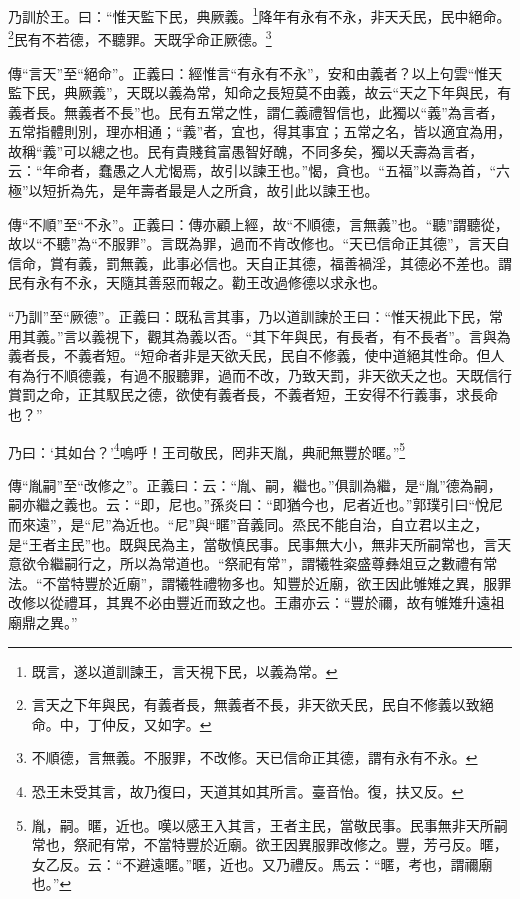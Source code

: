 乃訓於王。曰：“惟天監下民，典厥義。\footnote{既言，遂以道訓諫王，言天視下民，以義為常。}降年有永有不永，非天夭民，民中絕命。\footnote{言天之下年與民，有義者長，無義者不長，非天欲夭民，民自不修義以致絕命。中，丁仲反，又如字。}民有不若德，不聽罪。天既孚命正厥德。\footnote{不順德，言無義。不服罪，不改修。天已信命正其德，謂有永有不永。}


{\noindent\zhuan{}\fzbyks 傳“言天”至“絕命”。正義曰：經惟言“有永有不永”，安和由義者？以上句雲“惟天監下民，典厥義”，天既以義為常，知命之長短莫不由義，故云“天之下年與民，有義者長。無義者不長”也。民有五常之性，謂仁義禮智信也，此獨以“義”為言者，五常指體則別，理亦相通；“義”者，宜也，得其事宜；五常之名，皆以適宜為用，故稱“義”可以總之也。民有貴賤貧富愚智好醜，不同多矣，獨以夭壽為言者，云：“年命者，蠢愚之人尤愒焉，故引以諫王也。”愒，貪也。“五福”以壽為首，“六極”以短折為先，是年壽者最是人之所貪，故引此以諫王也。 \par}

{\noindent\zhuan{}\fzbyks 傳“不順”至“不永”。正義曰：傳亦顧上經，故“不順德，言無義”也。“聽”謂聽從，故以“不聽”為“不服罪”。言既為罪，過而不肯改修也。“天已信命正其德”，言天自信命，賞有義，罰無義，此事必信也。天自正其德，福善禍淫，其德必不差也。謂民有永有不永，天隨其善惡而報之。勸王改過修德以求永也。 \par}

{\noindent\shu{}\fzkt “乃訓”至“厥德”。正義曰：既私言其事，乃以道訓諫於王曰：“惟天視此下民，常用其義。”言以義視下，觀其為義以否。“其下年與民，有長者，有不長者”。言與為義者長，不義者短。“短命者非是天欲夭民，民自不修義，使中道絕其性命。但人有為行不順德義，有過不服聽罪，過而不改，乃致天罰，非天欲夭之也。天既信行賞罰之命，正其馭民之德，欲使有義者長，不義者短，王安得不行義事，求長命也？” \par}

乃曰：‘其如台？’\footnote{恐王未受其言，故乃復曰，天道其如其所言。臺音怡。復，扶又反。}嗚呼！王司敬民，罔非天胤，典祀無豐於暱。”\footnote{胤，嗣。暱，近也。嘆以感王入其言，王者主民，當敬民事。民事無非天所嗣常也，祭祀有常，不當特豐於近廟。欲王因異服罪改修之。豐，芳弓反。暱，女乙反。云：“不避遠暱。”暱，近也。又乃禮反。馬云：“暱，考也，謂禰廟也。”}


{\noindent\zhuan{}\fzbyks 傳“胤嗣”至“改修之”。正義曰：云：“胤、嗣，繼也。”俱訓為繼，是“胤”德為嗣，嗣亦繼之義也。云：“即，尼也。”孫炎曰：“即猶今也，尼者近也。”郭璞引曰“悅尼而來遠”，是“尼”為近也。“尼”與“暱”音義同。烝民不能自治，自立君以主之，是“王者主民”也。既與民為主，當敬慎民事。民事無大小，無非天所嗣常也，言天意欲令繼嗣行之，所以為常道也。“祭祀有常”，謂犧牲粢盛尊彝俎豆之數禮有常法。“不當特豐於近廟”，謂犧牲禮物多也。知豐於近廟，欲王因此雊雉之異，服罪改修以從禮耳，其異不必由豐近而致之也。王肅亦云：“豐於禰，故有雊雉升遠祖廟鼎之異。” \par}

